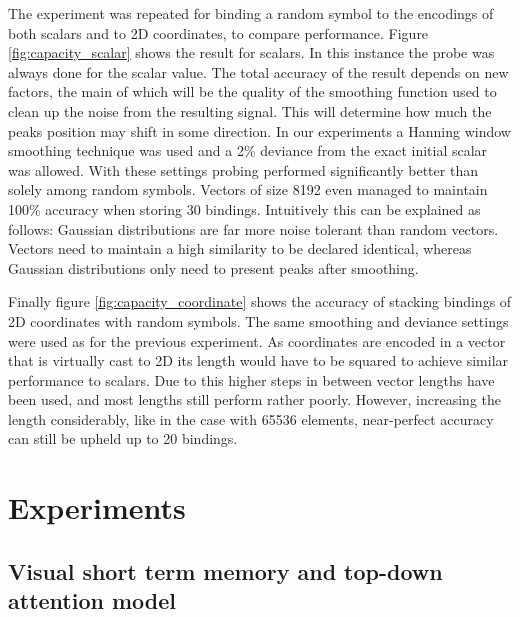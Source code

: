 \documentclass[conference]{IEEEtran}
\begin{document}
	The experiment was repeated for binding a random symbol to the encodings of both scalars and to 2D coordinates, to compare performance. Figure \ref{fig:capacity_scalar} shows the result for scalars. In this instance the probe was always done for the scalar value. The total accuracy of the result depends on new factors, the main of which will be the quality of the smoothing function used to clean up the noise from the resulting signal. This will determine how much the peaks position may shift in some direction. In our experiments a Hanning window smoothing technique was used and a 2\% deviance from the exact initial scalar was allowed. With these settings probing performed significantly better than solely among random symbols. Vectors of size 8192 even managed to maintain 100\% accuracy when storing 30 bindings. Intuitively this can be explained as follows: Gaussian distributions are far more noise tolerant than random vectors. Vectors need to maintain a high similarity to be declared identical, whereas Gaussian distributions only need to present peaks after smoothing. 
	
	Finally figure \ref{fig:capacity_coordinate} shows the accuracy of stacking bindings of 2D coordinates with random symbols. The same smoothing and deviance settings were used as for the previous experiment. As coordinates are encoded in a vector that is virtually cast to 2D its length would have to be squared to achieve similar performance to scalars. Due to this higher steps in between vector lengths have been used, and most lengths still perform rather poorly. However, increasing the length considerably, like in the case with 65536 elements, near-perfect accuracy can still be upheld up to 20 bindings.
		

		
	\section{Experiments}
	\label{sec:experiments}
	\subsection{Visual short term memory and top-down attention model}
	
\end{document}
